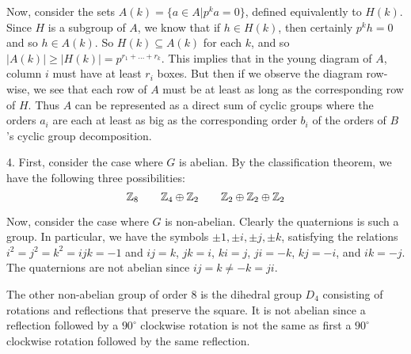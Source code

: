 Now, consider the sets $A(k) = \{a \in A | p^ka = 0\}$, defined equivalently to $H(k)$. Since $H$ is a subgroup of $A$, we know that if $h \in H(k)$, then certainly $p^kh = 0$ and so $h \in A(k)$. So $H(k) \subseteq A(k)$ for each $k$, and so $|A(k)| \geq |H(k)| = p^{r_1 + \dots + r_k}$. This implies that in the young diagram of $A$, column $i$ must have at least $r_i$ boxes. But then if we observe the diagram row-wise, we see that each row of $A$ must be at least as long as the corresponding row of $H$. Thus $A$ can be represented as a direct sum of cyclic groups where the orders $a_i$ are each at least as big as the corresponding order $b_i$ of the orders of $B$'s cyclic group decomposition.

4. First, consider the case where $G$ is abelian. By the classification theorem, we have the following three possibilities:
\[
\mathbb{Z}_8 \qquad \mathbb{Z}_4\oplus\mathbb{Z}_2 \qquad \mathbb{Z}_2\oplus\mathbb{Z}_2\oplus\mathbb{Z}_2
\]

Now, consider the case where $G$ is non-abelian. Clearly the quaternions is such a group. In particular, we have the symbols $\pm1, \pm i, \pm j, \pm k$, satisfying the relations $i^2 = j^2 = k^2 = ijk = -1$ and $ij = k$, $jk = i$, $ki = j$, $ji = -k$, $kj = -i$, and $ik = -j$. The quaternions are not abelian since $ij = k \neq -k = ji$.

The other non-abelian group of order 8 is the dihedral group $D_4$ consisting of rotations and reflections that preserve the square. It is not abelian since a reflection followed by a $90^\circ$ clockwise rotation is not the same as first a $90^\circ$ clockwise rotation followed by the same reflection.
